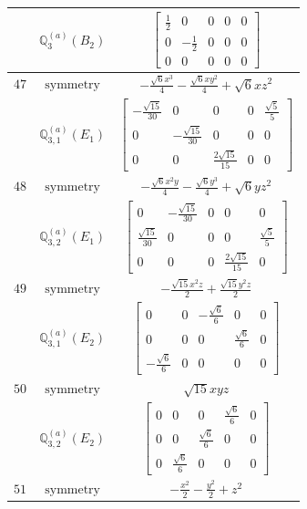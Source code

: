 \documentclass[fleqn,8pt,landscape]{jsarticle}
\begin{document}
\begin{longtable}{ccc}
$  $ & $ \mathbb{Q}_{3}^{(a)}(B_{2}) $ & $ \begin{bmatrix} \frac{1}{2} & 0 & 0 & 0 & 0 \\ 0 & - \frac{1}{2} & 0 & 0 & 0 \\ 0 & 0 & 0 & 0 & 0 \end{bmatrix} $ \\ \hline
$ 47 $ & $ \text{symmetry} $ & $ - \frac{\sqrt{6} x^{3}}{4} - \frac{\sqrt{6} x y^{2}}{4} + \sqrt{6} x z^{2} $ \\
$  $ & $ \mathbb{Q}_{3,1}^{(a)}(E_{1}) $ & $ \begin{bmatrix} - \frac{\sqrt{15}}{30} & 0 & 0 & 0 & \frac{\sqrt{5}}{5} \\ 0 & - \frac{\sqrt{15}}{30} & 0 & 0 & 0 \\ 0 & 0 & \frac{2 \sqrt{15}}{15} & 0 & 0 \end{bmatrix} $ \\ \hline
$ 48 $ & $ \text{symmetry} $ & $ - \frac{\sqrt{6} x^{2} y}{4} - \frac{\sqrt{6} y^{3}}{4} + \sqrt{6} y z^{2} $ \\
$  $ & $ \mathbb{Q}_{3,2}^{(a)}(E_{1}) $ & $ \begin{bmatrix} 0 & - \frac{\sqrt{15}}{30} & 0 & 0 & 0 \\ \frac{\sqrt{15}}{30} & 0 & 0 & 0 & \frac{\sqrt{5}}{5} \\ 0 & 0 & 0 & \frac{2 \sqrt{15}}{15} & 0 \end{bmatrix} $ \\ \hline
$ 49 $ & $ \text{symmetry} $ & $ - \frac{\sqrt{15} x^{2} z}{2} + \frac{\sqrt{15} y^{2} z}{2} $ \\
$  $ & $ \mathbb{Q}_{3,1}^{(a)}(E_{2}) $ & $ \begin{bmatrix} 0 & 0 & - \frac{\sqrt{6}}{6} & 0 & 0 \\ 0 & 0 & 0 & \frac{\sqrt{6}}{6} & 0 \\ - \frac{\sqrt{6}}{6} & 0 & 0 & 0 & 0 \end{bmatrix} $ \\ \hline
$ 50 $ & $ \text{symmetry} $ & $ \sqrt{15} x y z $ \\
$  $ & $ \mathbb{Q}_{3,2}^{(a)}(E_{2}) $ & $ \begin{bmatrix} 0 & 0 & 0 & \frac{\sqrt{6}}{6} & 0 \\ 0 & 0 & \frac{\sqrt{6}}{6} & 0 & 0 \\ 0 & \frac{\sqrt{6}}{6} & 0 & 0 & 0 \end{bmatrix} $ \\ \hline
$ 51 $ & $ \text{symmetry} $ & $ - \frac{x^{2}}{2} - \frac{y^{2}}{2} + z^{2} $ \\

\end{longtable}
\end{document}
